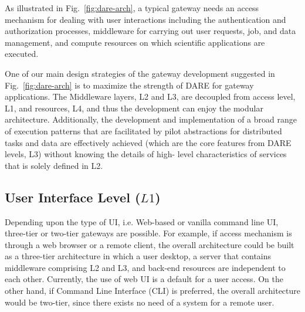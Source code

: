 \documentclass[]{svjour3}
\begin{document}
As illustrated in Fig.~\ref{fig:dare-arch}, a typical gateway needs an access mechanism for dealing with user 
interactions including the authentication and authorization processes, middleware for carrying out user requests, job, 
and data management, and compute resources on which scientific applications are executed. 

One of our main design strategies of the gateway development suggested in Fig.~\ref{fig:dare-arch} is to maximize the 
strength of DARE for gateway applications.  The Middleware layers, L2 and L3, are decoupled from access level, L1, and 
resources, L4, and thus the development can enjoy the modular architecture. Additionally, the development and 
implementation of a broad range of execution patterns that are facilitated by pilot abstractions for distributed tasks 
and data are effectively achieved (which are the core features from DARE levels, L3) without knowing the details of high-
level characteristics of services that is solely defined in L2. 

\subsection{User Interface Level ($L1$)}
Depending upon the type of UI, i.e. Web-based or vanilla command line UI, three-tier or two-tier gateways are
possible. For example, if access mechanism is through a web browser or
a remote client, the overall architecture could be built as a three-tier
architecture in which a user desktop, a server that contains middleware comprising L2 and L3, and back-end resources
are independent to each other. Currently, the use of web
UI is a default for a user access. On the other hand, if
Command Line Interface (CLI) is preferred, the overall architecture would be two-tier, since there exists no need of a 
system for a remote user.   
\end{document}
